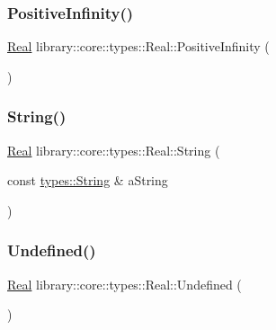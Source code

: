\subsubsection{\texorpdfstring{Positive\+Infinity()}{PositiveInfinity()}}
{\footnotesize\ttfamily \hyperlink{classlibrary_1_1core_1_1types_1_1_real}{Real} library\+::core\+::types\+::\+Real\+::\+Positive\+Infinity (\begin{DoxyParamCaption}{ }\end{DoxyParamCaption})\hspace{0.3cm}{\ttfamily [static]}}

\mbox{\label{classlibrary_1_1core_1_1types_1_1_real_ac0209eca829dcdc3b1be96f834763d8e}} 
\subsubsection{\texorpdfstring{String()}{String()}}
{\footnotesize\ttfamily \hyperlink{classlibrary_1_1core_1_1types_1_1_real}{Real} library\+::core\+::types\+::\+Real\+::\+String (\begin{DoxyParamCaption}\item[{const \hyperlink{classlibrary_1_1core_1_1types_1_1_string}{types\+::\+String} \&}]{a\+String }\end{DoxyParamCaption})\hspace{0.3cm}{\ttfamily [static]}}

\mbox{\label{classlibrary_1_1core_1_1types_1_1_real_a67778e3d4c5a5b6ca6ddcd47964b9a79}} 
\subsubsection{\texorpdfstring{Undefined()}{Undefined()}}
{\footnotesize\ttfamily \hyperlink{classlibrary_1_1core_1_1types_1_1_real}{Real} library\+::core\+::types\+::\+Real\+::\+Undefined (\begin{DoxyParamCaption}{ }\end{DoxyParamCaption})\hspace{0.3cm}{\ttfamily [static]}}

